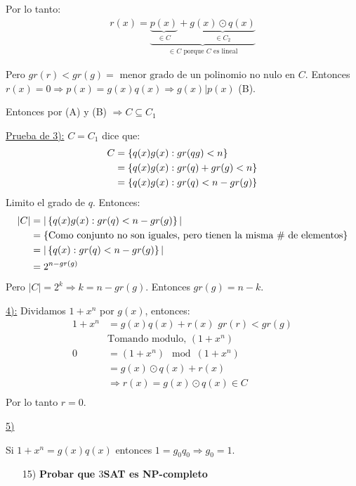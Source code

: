 \documentclass[12pt,a4paper]{article}
\begin{document}
Por lo tanto:
\begin{align*}
    r(x) = \underbrace{\underbrace{p(x)}_{\in C} + \underbrace{g(x) \odot q(x)}_{\in C_{2}}}_{\in C\,\,\text{porque $C$ es lineal}}
\end{align*}

Pero $gr(r) < gr(g) = \,\,\text{menor grado de un polinomio no nulo en $C$}$. 
Entonces $r(x) = 0 \Rightarrow p(x) = g(x)q(x) \Rightarrow g(x)|p(x)$ (B).
\medskip

Entonces por (A) y (B) $\Rightarrow C \subseteq C_{1}$
\medskip

\underline{Prueba de 3):} $C = C_{1}$ dice que:
\begin{align*}
    C &= \left\lbrace q(x)g(x): gr(qg)<n \right\rbrace \\
    &= \left\lbrace q(x)g(x): gr(q)+gr(g)<n \right\rbrace \\
    &= \left\lbrace q(x)g(x): gr(q)<n-gr(g) \right\rbrace \\
\end{align*}
Limito el grado de $q$. Entonces:
\begin{align*}
    |C| &= |\left\lbrace q(x)g(x):gr(q) < n-gr(g) \right\rbrace|\\
    &= \left\lbrace \text{Como conjunto no son iguales, pero tienen la misma $\#$ de elementos} \right\rbrace\\
    &= |\left\lbrace q(x):gr(q)<n-gr(g) \right\rbrace|\\
    &= 2^{n-gr(g)}\\
\end{align*}
Pero $|C| = 2^{k} \Rightarrow k = n- gr(g)$. Entonces $gr(g) = n-k$.
\medskip

\underline{4):} Dividamos $1+x^{n}$ por $g(x)$, entonces:
\begin{align*}
    1+x^{n} &= g(x)q(x) + r(x)\,\, gr(r) < gr(g)\\
    &\text{Tomando modulo, $(1+x^{n})$}\\
    0 &= (1+x^{n}) \mod (1+x^{n})\\
    &= g(x) \odot q(x) + r(x) \\
    &\Rightarrow r(x) = g(x) \odot q(x) \in C\\
\end{align*}
Por lo tanto $r=0$.
\medskip

\underline{5)}
\medskip

Si $1+x^{n} = g(x)q(x)$ entonces $1 = g_{0}q_{0} \Rightarrow g_{0} = 1$.

\begin{itemize}
    \item [15)] \textbf{Probar que $3$SAT es NP-completo}
    \label{dem:3sat}
\end{itemize}
\end{document}
